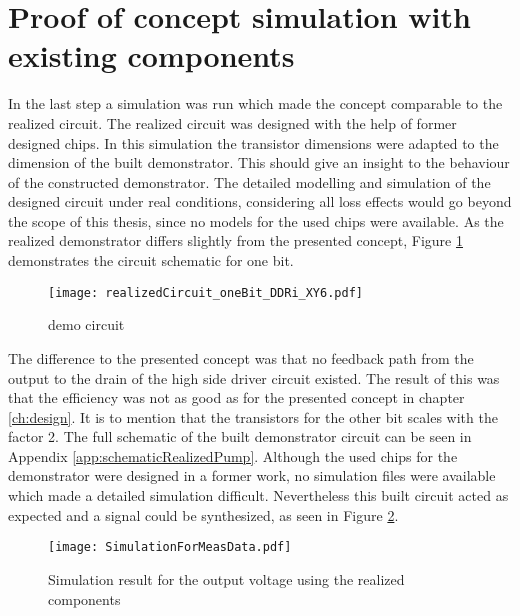 \newpage
\section{Proof of concept simulation with existing components}
\label{ch:ProofOfConceptWithExistingComponents}
In the last step a simulation was run which made the concept comparable to the realized circuit. 
The realized circuit was designed with the help of former designed chips.
In this simulation the transistor dimensions were adapted to the dimension of the built demonstrator. 
This should give an insight to the behaviour of the constructed demonstrator.
The detailed modelling and simulation of the designed circuit under real conditions, considering all loss effects would go beyond the scope of this thesis, since no models for the used chips were available.
As the realized demonstrator differs slightly from the presented concept, Figure \ref{fig:democircuit} demonstrates the circuit schematic for one bit.
\begin{figure}[htb!]
	\centering
  \texttt{[image: realizedCircuit\_oneBit\_DDRi\_XY6.pdf]}
	\caption{demo circuit}
	\label{fig:democircuit}
\end{figure}

The difference to the presented concept was that no feedback path from the output to the drain of the high side driver circuit existed.
The result of this was that the efficiency was not as good as for the presented concept in chapter \ref{ch:design}.
It is to mention that the transistors for the other bit scales with the factor 2.
The full schematic of the built demonstrator circuit can be seen in Appendix \ref{app:schematicRealizedPump}.
Although the used chips for the demonstrator were designed in a former work, no simulation files were available which made a detailed simulation difficult.
Nevertheless this built circuit acted as expected and a signal could be synthesized, as seen in Figure \ref{fig:sim}.

\begin{figure}[htb!]
	\centering
  \texttt{[image: SimulationForMeasData.pdf]}
	\caption{Simulation result for the output voltage using the realized components}
	\label{fig:sim}
\end{figure}

